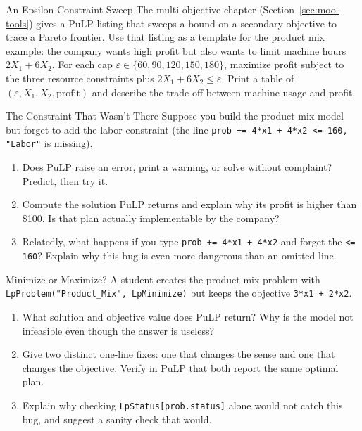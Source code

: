 \begin{ex}{An Epsilon-Constraint Sweep}{}
\label{ex:pulp-epsilon}
The multi-objective chapter (Section~\ref{sec:moo-tools}) gives a PuLP listing that sweeps a bound on a secondary objective to trace a Pareto frontier. Use that listing as a template for the product mix example: the company wants high profit but also wants to limit machine hours $2X_1 + 6X_2$. For each cap $\varepsilon \in \{60, 90, 120, 150, 180\}$, maximize profit subject to the three resource constraints plus $2X_1 + 6X_2 \leq \varepsilon$. Print a table of $(\varepsilon, X_1, X_2, \text{profit})$ and describe the trade-off between machine usage and profit.
\end{ex}


\begin{ex}{The Constraint That Wasn't There}{}
\label{ex:pulp-missing-constraint}
Suppose you build the product mix model but forget to add the labor constraint (the line \texttt{prob += 4*x1 + 4*x2 <= 160, "Labor"} is missing).
\begin{enumerate}
\item Does PuLP raise an error, print a warning, or solve without complaint? Predict, then try it.
\item Compute the solution PuLP returns and explain why its profit is higher than \$100. Is that plan actually implementable by the company?
\item Relatedly, what happens if you type \texttt{prob += 4*x1 + 4*x2} and forget the \texttt{<= 160}? Explain why this bug is even more dangerous than an omitted line.
\end{enumerate}
\end{ex}

\begin{ex}{Minimize or Maximize?}{}
\label{ex:pulp-sense}
A student creates the product mix problem with \texttt{LpProblem("Product\_Mix", LpMinimize)} but keeps the objective \texttt{3*x1 + 2*x2}.
\begin{enumerate}
\item What solution and objective value does PuLP return? Why is the model not infeasible even though the answer is useless?
\item Give two distinct one-line fixes: one that changes the sense and one that changes the objective. Verify in PuLP that both report the same optimal plan.
\item Explain why checking \texttt{LpStatus[prob.status]} alone would not catch this bug, and suggest a sanity check that would.
\end{enumerate}
\end{ex}

